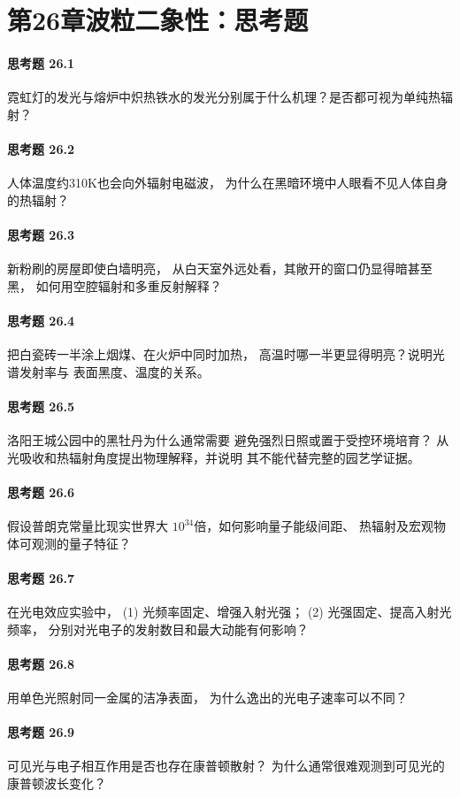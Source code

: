\section*{第26章\quad 波粒二象性：思考题}
\paragraph{思考题 26.1}
霓虹灯的发光与熔炉中炽热铁水的发光分别属于什么机理？是否都可视为单纯热辐射？
\paragraph{思考题 26.2}
人体温度约310K也会向外辐射电磁波，
为什么在黑暗环境中人眼看不见人体自身的热辐射？
\paragraph{思考题 26.3}
新粉刷的房屋即使白墙明亮，
从白天室外远处看，其敞开的窗口仍显得暗甚至黑，
如何用空腔辐射和多重反射解释？
\paragraph{思考题 26.4}
把白瓷砖一半涂上烟煤、在火炉中同时加热，
高温时哪一半更显得明亮？说明光谱发射率与
表面黑度、温度的关系。
\paragraph{思考题 26.5}
洛阳王城公园中的黑牡丹为什么通常需要
避免强烈日照或置于受控环境培育？
从光吸收和热辐射角度提出物理解释，并说明
其不能代替完整的园艺学证据。
\paragraph{思考题 26.6}
假设普朗克常量比现实世界大
\(10^{34}\)倍，如何影响量子能级间距、
热辐射及宏观物体可观测的量子特征？
\paragraph{思考题 26.7}
在光电效应实验中，
(1) 光频率固定、增强入射光强；
(2) 光强固定、提高入射光频率，
分别对光电子的发射数目和最大动能有何影响？
\paragraph{思考题 26.8}
用单色光照射同一金属的洁净表面，
为什么逸出的光电子速率可以不同？
\paragraph{思考题 26.9}
可见光与电子相互作用是否也存在康普顿散射？
为什么通常很难观测到可见光的康普顿波长变化？

